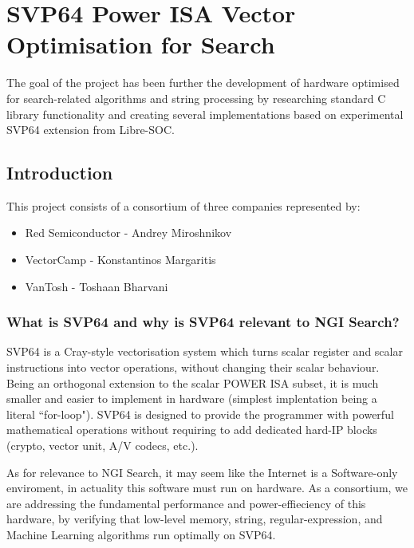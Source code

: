 \chapter{SVP64 Power ISA Vector Optimisation for Search}

The goal of the project has been further the development of hardware
optimised for search-related algorithms and string processing by
researching standard C library functionality and creating several
implementations based on experimental \acrshort{SVP64} extension from Libre-SOC.

\section{Introduction}

This project consists of a consortium of three companies represented by:

\begin{itemize}
  \item Red Semiconductor - Andrey Miroshnikov
  \item VectorCamp - Konstantinos Margaritis
  \item VanTosh - Toshaan Bharvani
\end{itemize}

\subsection{What is \acrshort{SVP64} and why is \acrshort{SVP64} relevant to NGI Search?}

\acrfull{SVP64} is a Cray-style vectorisation system which
turns scalar register and scalar instructions into vector operations,
without changing their scalar behaviour. Being an orthogonal extension to the
scalar \acrfull{POWER} ISA subset, it is much smaller and easier to implement in
hardware (simplest implentation being a literal ``for-loop"). \acrshort{SVP64} is
designed to provide the programmer with powerful mathematical operations
without requiring to add dedicated hard-IP blocks (crypto, vector unit, A/V
codecs, etc.).

As for relevance to \acrfull{NGI} Search, it may seem like the Internet is a
Software-only enviroment, in actuality this software must run on hardware.
As a consortium, we are addressing the fundamental performance and
power-effieciency of this hardware, by verifying that low-level memory,
string, regular-expression, and Machine Learning algorithms run optimally
on \acrshort{SVP64}.


